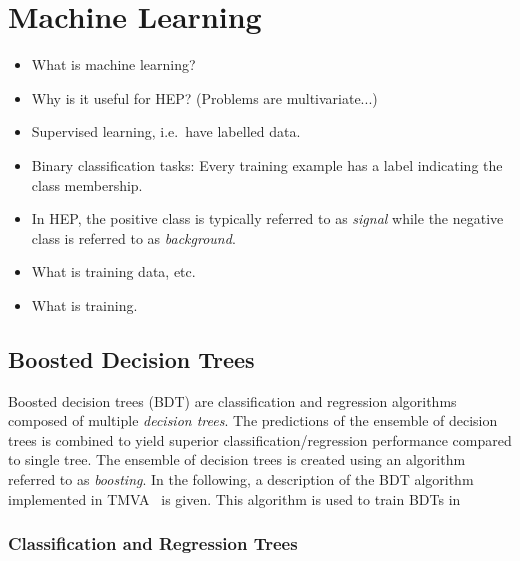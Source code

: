 \section{Machine Learning}

\begin{itemize}
\item What is machine learning?

\item Why is it useful for HEP? (Problems are multivariate...)

\item Supervised learning, i.e.\ have labelled data.

\item Binary classification tasks: Every training example has a label indicating
  the class membership.

\item In HEP, the positive class is typically referred to as \emph{signal} while
  the negative class is referred to as \emph{background}.

\item What is training data, etc.

\item What is training.
\end{itemize}


\subsection{Boosted Decision Trees}

Boosted decision trees (BDT) are classification and regression algorithms
composed of multiple \emph{decision trees}. The predictions of the ensemble of
decision trees is combined to yield superior classification/regression
performance compared to single tree. The ensemble of decision trees is created
using an algorithm referred to as \emph{boosting}. In the following, a
description of the BDT algorithm implemented in \textsc{TMVA}~\cite{TMVA} is
given. This algorithm is used to train BDTs in


\subsubsection{Classification and Regression Trees}

